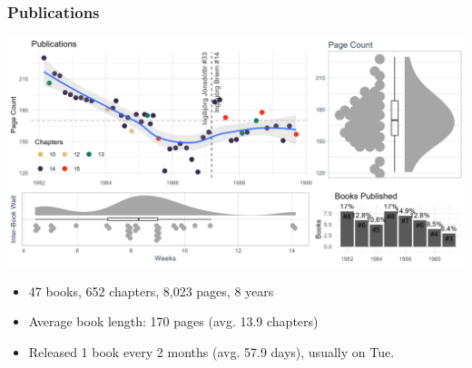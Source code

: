 \begin{frame}
    \frametitle{Publications}
    \includegraphics[width=\textwidth]{../R/figures/margit_count}
    \vspace{-24pt}
    \begin{itemize}
        \item 47 books, 652 chapters, 8,023 pages, 8 years
        \item Average book length: 170 pages (avg. 13.9 chapters)
        \item Released 1 book every 2 months (avg. 57.9 days), usually on Tue.
    \end{itemize}
\end{frame}
